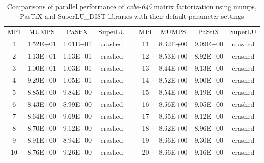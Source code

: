 \begin{table}[ht]
\centering
\begin{tabular}{|c|c|c|c|l|c|c|c|c|}
\cline{1-4} \cline{6-9}
MPI & MUMPS    & PaStiX   & SuperLU &  & MPI & MUMPS    & PaStiX   & SuperLU \\ \cline{1-4} \cline{6-9} 
1   & 1.52E+01 & 1.61E+01 & crashed &  & 11  & 8.62E+00 & 9.09E+00 & crashed \\ \cline{1-4} \cline{6-9} 
2   & 1.13E+01 & 1.13E+01 & crashed &  & 12  & 8.53E+00 & 8.92E+00 & crashed \\ \cline{1-4} \cline{6-9} 
3   & 1.00E+01 & 1.03E+01 & crashed &  & 13  & 8.44E+00 & 9.13E+00 & crashed \\ \cline{1-4} \cline{6-9} 
4   & 9.29E+00 & 1.05E+01 & crashed &  & 14  & 8.52E+00 & 9.00E+00 & crashed \\ \cline{1-4} \cline{6-9} 
5   & 8.85E+00 & 9.84E+00 & crashed &  & 15  & 8.54E+00 & 9.19E+00 & crashed \\ \cline{1-4} \cline{6-9} 
6   & 8.43E+00 & 8.99E+00 & crashed &  & 16  & 8.56E+00 & 9.05E+00 & crashed \\ \cline{1-4} \cline{6-9} 
7   & 8.64E+00 & 9.69E+00 & crashed &  & 17  & 8.65E+00 & 9.12E+00 & crashed \\ \cline{1-4} \cline{6-9} 
8   & 8.70E+00 & 9.12E+00 & crashed &  & 18  & 8.62E+00 & 8.96E+00 & crashed \\ \cline{1-4} \cline{6-9} 
9   & 8.91E+00 & 8.94E+00 & crashed &  & 19  & 8.66E+00 & 9.30E+00 & crashed \\ \cline{1-4} \cline{6-9} 
10  & 8.76E+00 & 9.26E+00 & crashed &  & 20  & 8.66E+00 & 9.16E+00 & crashed \\ \cline{1-4} \cline{6-9} 
\end{tabular}
\caption{Comparisons of parallel performance of  \textit{cube-645} matrix factorization using \acrshort{mumps}, PasTiX and SuperLU\_DIST libraries with their default parameter settings}
\label{table:app-lc-cube-645-result}
\end{table}

\newpage